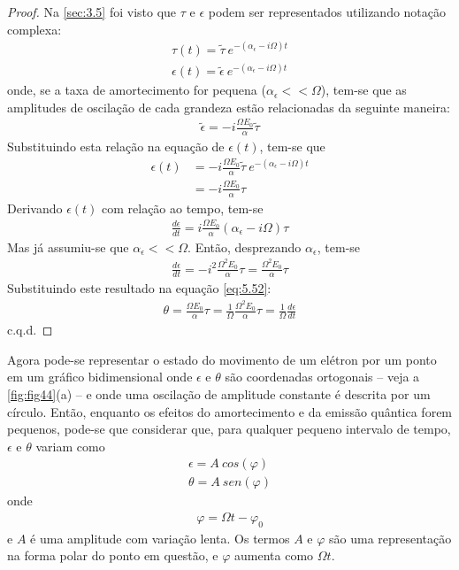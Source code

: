 \begin{proof}
	Na \autoref{sec:3.5} foi visto que $\tau$ e $\epsilon$ podem ser representados utilizando notação complexa:
	\begin{align*}
		\tau(t) = \tilde{\tau}\ e^{-(\alpha_\epsilon - i\Omega)t}\\
		\epsilon(t) = \tilde{\epsilon}\ e^{-(\alpha_\epsilon - i\Omega)t}
	\end{align*}
	onde, se a taxa de amortecimento for pequena ($\alpha_\epsilon << \Omega$), tem-se que as amplitudes de oscilação de cada grandeza estão relacionadas da seguinte maneira:
	\begin{align*}
		\tilde{\epsilon} = -i\frac{\Omega E_0}{\alpha}\tilde{\tau}
	\end{align*}
	Substituindo esta relação na equação de $\epsilon(t)$, tem-se que
	\begin{align*}
		\epsilon(t) &= -i\frac{\Omega E_0}{\alpha}\tilde{\tau}\ e^{-(\alpha_\epsilon - i\Omega)t}\\
					&= -i\frac{\Omega E_0}{\alpha}\tau
	\end{align*}
	Derivando $\epsilon(t)$ com relação ao tempo, tem-se
	\begin{align*}
		\frac{d\epsilon}{dt} = i\frac{\Omega E_0}{\alpha} (\alpha_\epsilon-i\Omega)\tau
	\end{align*}
	Mas já assumiu-se que $\alpha_\epsilon << \Omega$. Então, desprezando $\alpha_\epsilon$, tem-se
	\begin{align*}
		\frac{d\epsilon}{dt} = -i^2\frac{\Omega^2 E_0}{\alpha}\tau = \frac{\Omega^2 E_0}{\alpha}\tau
	\end{align*}
	Substituindo este resultado na equação \eqref{eq:5.52}:
	\begin{align*}
		\theta = \frac{\Omega E_0}{\alpha}\tau = \frac{1}{\Omega}\frac{\Omega^2 E_0}{\alpha}\tau = \frac{1}{\Omega}\frac{d\epsilon}{dt}
	\end{align*}
	c.q.d.
\end{proof}

Agora pode-se representar o estado do movimento de um elétron por um ponto em um gráfico bidimensional onde $\epsilon$ e $\theta$ são coordenadas ortogonais -- veja a \autoref{fig:fig44}(a) -- e onde uma oscilação de amplitude constante é descrita por um círculo. Então, enquanto os efeitos do amortecimento e da emissão quântica forem pequenos, pode-se que considerar que, para qualquer pequeno intervalo de tempo, $\epsilon$ e $\theta$ variam como
\begin{align}
	\epsilon = A\ cos(\varphi)\\
	\theta = A\ sen(\varphi)
\end{align}
onde
\begin{align}
	\varphi = \Omega t - \varphi_0
\end{align}
e $A$ é uma amplitude com variação lenta. Os termos $A$ e $\varphi$ são uma representação na forma polar do ponto em questão, e $\varphi$ aumenta como $\Omega t$.

